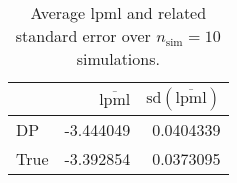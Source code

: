 \begin{table}[H]

\caption{Average lpml and related standard error over $n_{\text{sim}} = 10$ simulations.}
\centering
\begin{tabular}[t]{lrr}
\toprule
  & $\overbar{\text{lpml}}$ & $\text{sd}(\overbar{\text{lpml}})$\\
\midrule
DP & -3.444049 & 0.0404339\\
True & -3.392854 & 0.0373095\\
\bottomrule
\end{tabular}
\end{table}